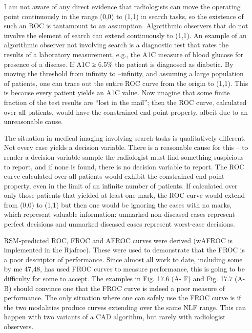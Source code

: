 \documentclass[
]{book}
\begin{document}
I am not aware of any direct evidence that radiologists can move the operating point continuously in the range (0,0) to (1,1) in search tasks, so the existence of such an ROC is tantamount to an assumption. Algorithmic observers that do not involve the element of search can extend continuously to (1,1). An example of an algorithmic observer not involving search is a diagnostic test that rates the results of a laboratory measurement, e.g., the A1C measure of blood glucose for presence of a disease. If A1C ≥ 6.5\% the patient is diagnosed as diabetic. By moving the threshold from infinity to --infinity, and assuming a large population of patients, one can trace out the entire ROC curve from the origin to (1,1). This is because every patient yields an A1C value. Now imagine that some finite fraction of the test results are ``lost in the mail''; then the ROC curve, calculated over all patients, would have the constrained end-point property, albeit due to an unreasonable cause.

The situation in medical imaging involving search tasks is qualitatively different. Not every case yields a decision variable. There is a reasonable cause for this -- to render a decision variable sample the radiologist must find something suspicious to report, and if none is found, there is no decision variable to report. The ROC curve calculated over all patients would exhibit the constrained end-point property, even in the limit of an infinite number of patients. If calculated over only those patients that yielded at least one mark, the ROC curve would extend from (0,0) to (1,1) but then one would be ignoring the cases with no marks, which represent valuable information: unmarked non-diseased cases represent perfect decisions and unmarked diseased cases represent worst-case decisions.

RSM-predicted ROC, FROC and AFROC curves were derived (wAFROC is implemented in the Rjafroc). These were used to demonstrate that the FROC is a poor descriptor of performance. Since almost all work to date, including some by me 47,48, has used FROC curves to measure performance, this is going to be difficulty for some to accept. The examples in Fig. 17.6 (A- F) and Fig. 17.7 (A-B) should convince one that the FROC curve is indeed a poor measure of performance. The only situation where one can safely use the FROC curve is if the two modalities produce curves extending over the same NLF range. This can happen with two variants of a CAD algorithm, but rarely with radiologist observers.
\end{document}
